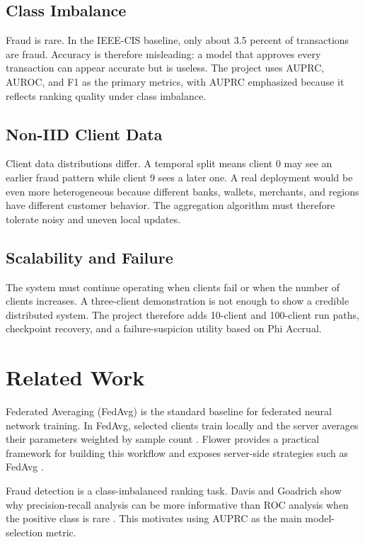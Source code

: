 \documentclass[conference]{IEEEtran}
\begin{document}
\subsection{Class Imbalance}

Fraud is rare. In the IEEE-CIS baseline, only about 3.5 percent of transactions
are fraud. Accuracy is therefore misleading: a model that approves every
transaction can appear accurate but is useless. The project uses AUPRC, AUROC,
and F1 as the primary metrics, with AUPRC emphasized because it reflects ranking
quality under class imbalance.

\subsection{Non-IID Client Data}

Client data distributions differ. A temporal split means client 0 may see an
earlier fraud pattern while client 9 sees a later one. A real deployment would
be even more heterogeneous because different banks, wallets, merchants, and
regions have different customer behavior. The aggregation algorithm must
therefore tolerate noisy and uneven local updates.

\subsection{Scalability and Failure}

The system must continue operating when clients fail or when the number of
clients increases. A three-client demonstration is not enough to show a credible
distributed system. The project therefore adds 10-client and 100-client run
paths, checkpoint recovery, and a failure-suspicion utility based on Phi
Accrual.

\section{Related Work}

Federated Averaging (FedAvg) is the standard baseline for federated neural
network training. In FedAvg, selected clients train locally and the server
averages their parameters weighted by sample count \cite{fedavg}. Flower
provides a practical framework for building this workflow and exposes
server-side strategies such as FedAvg \cite{flowerstrategy, flowerdocs}.

Fraud detection is a class-imbalanced ranking task. Davis and Goadrich show why
precision-recall analysis can be more informative than ROC analysis when the
positive class is rare \cite{prroc}. This motivates using AUPRC as the main
model-selection metric.
\end{document}
